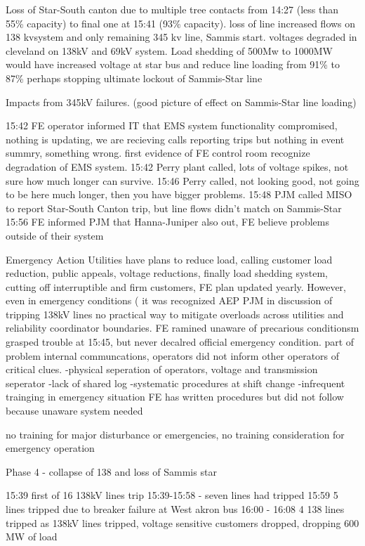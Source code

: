 Loss of Star-South canton due to multiple tree contacts from 14:27  (less than 55\% capacity) to final one at 15:41 (93\% capacity).  loss of line increased flows on 138 kvsystem and only remaining 345 kv line, Sammis start.  voltages degraded in cleveland on 138kV and 69kV system.  Load shedding of 500Mw to 1000MW would have increased voltage at star bus and reduce line loading from 91\% to 87\% perhaps stopping ultimate lockout of Sammis-Star line

Impacts from 345kV failures.  (good picture of effect on Sammis-Star line loading)

15:42 FE operator informed IT that EMS system functionality compromised, nothing is updating, we are recieving calls reporting trips but nothing in event summry, something wrong.  first evidence of FE control room recognize degradation of EMS system.  
15:42 Perry plant called, lots of voltage spikes, not sure how much longer can survive.
15:46 Perry called, not looking good, not going to be here much longer, then you have bigger problems.
15:48 PJM called MISO to report Star-South Canton trip, but line flows didn't match on Sammis-Star
15:56 FE informed PJM that Hanna-Juniper also out, FE believe problems outside of their system 

Emergency Action
Utilities have plans to reduce load, calling customer load reduction, public appeals, voltage reductions, finally load shedding system, cutting off interruptible and firm customers, FE plan updated yearly.  However, even in emergency conditions ( it was recognized AEP PJM in discussion of tripping 138kV lines no practical way to mitigate overloads across utilities and reliability coordinator boundaries.
FE ramined unaware of precarious conditionsm grasped trouble at 15:45, but never decalred official emergency condition.
part of problem internal communcations, operators did not inform other operators of critical clues.
-physical seperation of operators, voltage and transmission seperator
-lack of shared log
-systematic procedures at shift change
-infrequent trainging in emergency situation
FE has written procedures but did not follow because unaware system needed

no training for major disturbance or emergencies, no training consideration for emergency operation


Phase 4 - collapse of 138 and loss of Sammis star

15:39 first of 16 138kV lines trip
15:39-15:58 - seven lines had tripped
15:59 5 lines tripped due to breaker failure at West akron bus
16:00 - 16:08 4 138 lines tripped
as 138kV lines tripped, voltage sensitive customers dropped, dropping 600 MW of load

